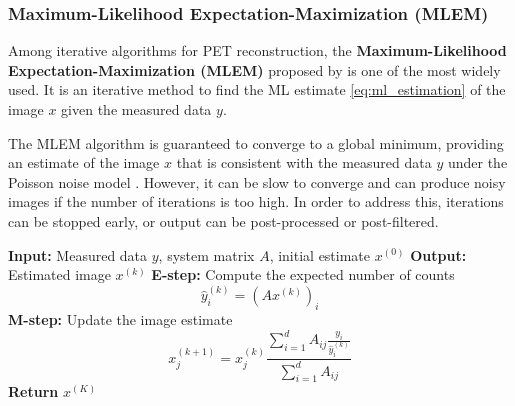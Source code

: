 \subsubsection{Maximum-Likelihood Expectation-Maximization (MLEM)}

Among iterative algorithms for PET reconstruction, the \textbf{Maximum-Likelihood Expectation-Maximization (MLEM)} proposed by \cite{Shepp1982} is one of the most widely used. It is an iterative method to find the ML estimate \eqref{eq:ml_estimation} of the image $x$ given the measured data $y$.

The MLEM algorithm is guaranteed to converge to a global minimum, providing an estimate of the image $x$ that is consistent with the measured data $y$ under the Poisson noise model \cite{8467338}.
However, it can be slow to converge and can produce noisy images if the number of iterations is too high.
In order to address this, iterations can be stopped early, or output can be post-processed or post-filtered.

\begin{algorithm}
\caption{Maximum-Likelihood Expectation-Maximization (MLEM)}
\begin{algorithmic}[1]
\State \textbf{Input:} Measured data $y$, system matrix $A$, initial estimate $x^{(0)}$
\State \textbf{Output:} Estimated image $x^{(k)}$
    \State \textbf{E-step:} Compute the expected number of counts
    \begin{equation*}
        \hat{y}_i^{(k)} = (Ax^{(k)})_i
    \end{equation*}
    \State \textbf{M-step:} Update the image estimate
    \begin{equation*}
        x_j^{(k+1)} = x_j^{(k)} \frac{\sum_{i=1}^{d} A_{ij} \frac{y_i}{\hat{y}_i^{(k)}}}{\sum_{i=1}^{d} A_{ij}}
    \end{equation*}
\EndFor
\State \textbf{Return} $x^{(K)}$
\end{algorithmic}
\label{alg:mlem}
\end{algorithm}


